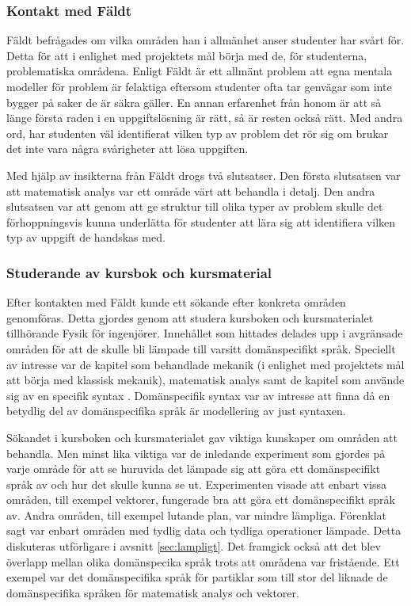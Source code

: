 \begin{draft}
\subsubsection{Kontakt med Fäldt}

Fäldt befrågades om vilka områden han i allmänhet anser studenter har
svårt för. Detta för att i enlighet med projektets mål börja med de, för
studenterna, problematiska områdena. Enligt Fäldt är ett allmänt problem att
egna mentala modeller för problem är felaktiga eftersom studenter ofta tar
genvägar som inte bygger på saker de är säkra gäller. En annan erfarenhet
från honom är att så länge första raden i en uppgiftslösning är rätt, så är
resten också rätt. Med andra ord, har studenten väl identifierat vilken typ av
problem det rör sig om brukar det inte vara några svårigheter att lösa
uppgiften.

Med hjälp av insikterna från Fäldt drogs två slutsatser. Den första slutsatsen
var att matematisk analys var ett område värt att behandla i detalj. Den andra
slutsatsen var att genom att ge struktur till olika typer av problem skulle det
förhoppningsvis kunna underlätta för studenter att lära sig att identifiera vilken
typ av uppgift de handskas med.

\subsubsection{Studerande av kursbok och kursmaterial}

Efter kontakten med Fäldt kunde ett sökande efter konkreta områden genomföras. Detta gjordes genom att studera kursboken och kursmaterialet tillhörande Fysik för ingenjörer. Innehållet som hittades delades upp i avgränsade områden för att de skulle bli lämpade till varsitt domänspecifikt språk. Speciellt av intresse var de kapitel som behandlade mekanik (i enlighet med projektets mål att börja med klassisk mekanik), matematisk analys samt de kapitel som använde sig av en specifik syntax . Domänspecifik syntax var av intresse att finna då en betydlig del av domänspecifika språk är modellering av just syntaxen. 

Sökandet i kursboken och kursmaterialet gav viktiga kunskaper om områden att behandla. Men minst lika viktiga var de inledande experiment som gjordes på varje område för att se huruvida det lämpade sig att göra ett domänspecifikt språk av och hur det skulle kunna se ut. Experimenten visade att enbart vissa områden, till exempel vektorer, fungerade bra att göra ett domänspecifikt språk av. Andra områden, till exempel lutande plan, var mindre lämpliga. Förenklat sagt var enbart områden med tydlig data och tydliga operationer lämpade. Detta diskuteras utförligare i avsnitt \ref{sec:lampligt}. Det framgick också att det blev överlapp mellan olika domänspecika språk trots att områdena var fristående. Ett exempel var det domänspecifika språk för partiklar som till stor del liknade de domänspecifika språken för matematisk analys och vektorer.


\end{draft}
